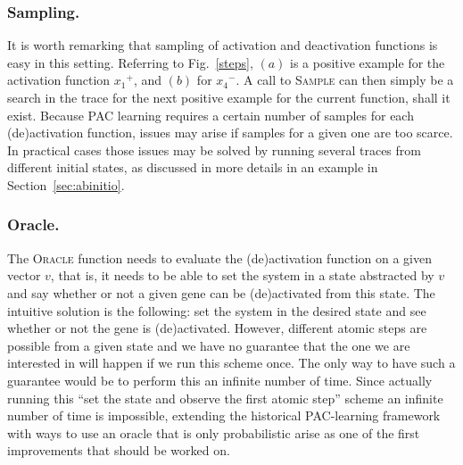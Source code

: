 \documentclass{llncs}
\begin{document}

\subsubsection{Sampling.}

It is worth remarking that sampling of activation and deactivation functions is easy in this setting. Referring to Fig.~\ref{steps}, $(a)$ is a positive example for the activation function ${x_1}^+$, and $(b)$ for ${x_4}^-$.
A call to \textsc{Sample} can then simply be a search in the trace for the next positive example for the current function, shall it exist. Because PAC learning requires a certain number of samples for each (de)activation function, issues may arise if samples for a given one are too scarce.
In practical cases those issues may be solved by running several traces from
different initial states, as discussed in more details in an
example in Section~\ref{sec:abinitio}.

\subsubsection{Oracle.}
The \textsc{Oracle} function needs to evaluate the (de)activation function on a given vector $v$, that is, it needs to be able to set the system in a state abstracted by $v$ and say whether or not a given gene can be (de)activated from this state.
The intuitive solution is the following: set the system in the desired state and see whether or not the gene is (de)activated. 
However, different atomic steps are possible from a given state and we have no guarantee that the one we are interested in will happen if we run this scheme once. The only way to have such a guarantee would be to perform this an infinite number of time.
Since actually running this ``set the state and observe the first atomic step'' scheme an infinite number of time is impossible, extending the historical PAC-learning framework with ways to use an oracle that is only probabilistic arise as one of the first improvements that should be worked on.
\end{document}
